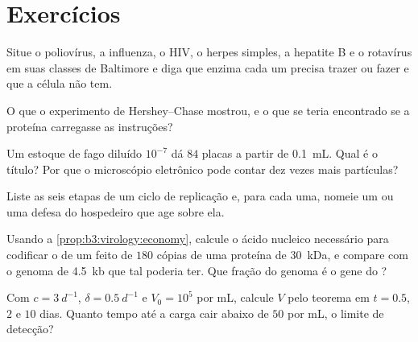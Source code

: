 \section{Exercícios}

\begin{exercise}[$\star$]\label{exo:b3:virology:1}
Situe o poliovírus, a influenza, o HIV, o herpes simples, a hepatite B
e o rotavírus em suas classes de Baltimore e diga que enzima cada um
precisa trazer ou fazer e que a célula não tem.
\end{exercise}

\begin{exercise}[$\star$]\label{exo:b3:virology:2}
O que o experimento de Hershey--Chase mostrou, e o que se teria
encontrado se a proteína carregasse as instruções?
\end{exercise}

\begin{exercise}[$\star$]\label{exo:b3:virology:3}
Um estoque de fago diluído $10^{-7}$ dá $84$ placas a partir de
\qty{0.1}{mL}. Qual é o título? Por que o microscópio eletrônico pode
contar dez vezes mais partículas?
\end{exercise}

\begin{exercise}[$\star$]\label{exo:b3:virology:4}
Liste as seis etapas de um ciclo de replicação e, para cada uma, nomeie
um  ou uma defesa do hospedeiro que age sobre ela.
\end{exercise}

\begin{exercise}[$\star\star$]\label{exo:b3:virology:5}
Usando a \cref{prop:b3:virology:economy}, calcule o ácido nucleico
necessário para codificar o  de um  feito de $180$ cópias
de uma proteína de \qty{30}{kDa}, e compare com o genoma de
\qty{4.5}{kb} que tal  poderia ter. Que fração do genoma é o gene
do ?
\end{exercise}

\begin{exercise}[$\star\star$]\label{exo:b3:virology:6}
Com $c = \qty{3}{d^{-1}}$, $\delta = \qty{0.5}{d^{-1}}$ e
$V_{0} =
10^{5}$ por mL, calcule $V$ pelo teorema em $t = 0.5$, $2$ e
$10$ dias. Quanto tempo até a carga cair abaixo de $50$ por mL, o
limite de detecção?
\end{exercise}

